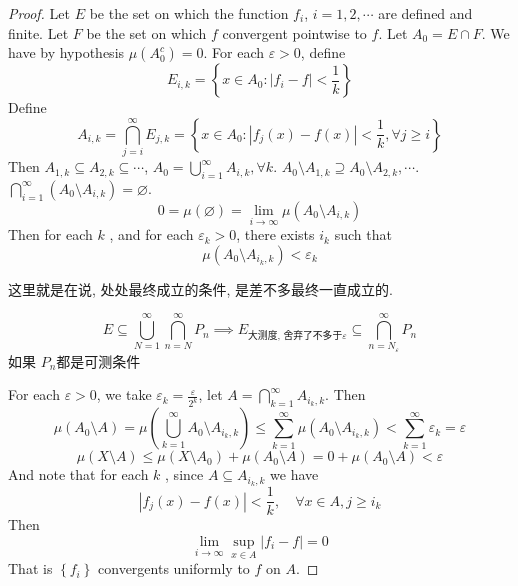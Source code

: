 \documentclass[../main.tex]{subfiles}
\begin{document}
\begin{proof}
 Let \(  E  \) be the set on which the function \(  f_{i}  \), \(  i= 1,2,\cdots   \) are defined and finite.   Let \(  F  \) be the set  on which \(  f  \) convergent pointwise to \(  f  \). Let \(  A_0=   E\cap F \). We have by hypothesis \(  \mu \left( A_0^{c} \right)= 0   \). For each \(   \varepsilon > 0  \), define \[
E_{i,k}= \left\{ x\in A_0: \left| f_{i}-f \right|<  \frac{1 }{k }   \right\}
 \]    Define \[
 A_{i,k}= \bigcap _{j = i}^{\infty}E_{j,k}= \left\{ x\in A_0: \left| f_{j}\left( x \right)-f\left( x \right)   \right|< \frac{1 }{k }, \forall j\ge i   \right\}
 \]Then \(  A_{1,k}\subseteq A_{2,k}\subseteq \cdots   \), \(  A_0= \bigcup _{i= 1}^{\infty}A_{i,k}, \forall k  \).  \(A_0\setminus A_{1,k}\supseteq A_0\setminus A_{2,k},\cdots   \). \(  \bigcap _{i= 1}^{\infty}\left( A_0\setminus A_{i,k} \right) = \varnothing \). \[
 0= \mu \left( \varnothing \right)=  \lim_{i\to \infty}\mu \left(A_0\setminus A_{i,k} \right) 
 \]  Then for each \(  k  \) , and for each \(   \varepsilon _{k}> 0  \),  there exists \( i_{k}\) such that     \[
 \mu \left( A_0\setminus A_{i_{k},k} \right)<  \varepsilon _{k} 
 \]  
\begin{remark}
    这里就是在说, 处处最终成立的条件, 是差不多最终一直成立的.

    \[
    E\subseteq \bigcup _{N= 1}^{\infty}\bigcap _{n = N}^{\infty}P_{n}\implies  E_{\text{大测度, 舍弃了不多于} \varepsilon }\subseteq \bigcap _{n = N_{ \varepsilon }}^{\infty}P_{n}
    \]如果 \(  P_{n}  \)都是可测条件 
\end{remark}
 For each \(   \varepsilon > 0  \), we take \(   \varepsilon _{k}= \frac{ \varepsilon  }{2^{k} }   \), let \(  A= \bigcap _{k= 1}^{\infty}A_{i_{k},k}  \). Then \[
 \mu \left( A_0\setminus A \right)= \mu \left( \bigcup _{k= 1}^{\infty}A_0\setminus A_{i_{k},k}  \right)\le  \sum _{k= 1}^{\infty}\mu \left( A_0\setminus A_{i_{k},k}  \right)<  \sum _{k= 1}^{\infty} \varepsilon _{k}=  \varepsilon 
 \] \[
 \mu \left( X\setminus A \right)\le \mu \left( X\setminus A_0 \right)+ \mu \left( A_0\setminus A \right)= 0+ \mu \left( A_0\setminus A \right)<  \varepsilon     
 \]   And note that for each \(  k  \)   , since \(  A\subseteq A_{i_{k},k}  \) we have \[
 \left| f_{j}\left( x \right)-f\left( x \right)   \right|< \frac{1 }{k },  \quad \forall x \in A,j\ge i_{k}
 \]Then \[
 \lim_{i\to \infty}\sup _{x\in A}\left| f_{i}-f \right|= 0 
 \]That is \(  \left\{ f_{i} \right\}  \) convergents uniformly to \(  f  \) on \(  A  \).   
\end{proof}
\end{document}
